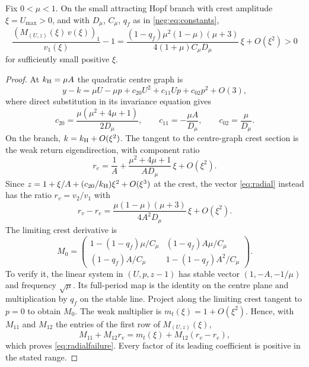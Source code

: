 \begin{theorem}\label{thm:failed}
Fix $0<\mu<1$. On the small attracting Hopf branch with crest amplitude $\xi=U_{\max}>0$, and with $D_\mu$, $C_\mu$, $q_f$ as in \eqref{neg:eq:constants},
\begin{equation}\label{eq:radialfailure}
\frac{(M_{(U,z)}(\xi)\,v(\xi))_1}{v_1(\xi)}-1
=\frac{(1-q_f)\mu^2(1-\mu)(\mu+3)}
 {4(1+\mu)C_\mu D_\mu}\,\xi+O(\xi^2)>0
\end{equation}
for sufficiently small positive $\xi$.
\end{theorem}
\begin{proof}
At $k_{\mathrm H}=\mu A$ the quadratic centre graph is
\begin{equation}\label{neg:eq:centregraph}
y-k=\mu U-\mu p+c_{20}U^2+c_{11}Up+c_{02}p^2+O(3),
\end{equation}
where direct substitution in its invariance equation gives
\begin{equation}\label{neg:eq:centrecoeff}
c_{20}=\frac{\mu(\mu^2+4\mu+1)}{2D_\mu},\qquad
c_{11}=-\frac{\mu A}{D_\mu},\qquad c_{02}=\frac\mu{D_\mu}.
\end{equation}
On the branch, $k=k_{\mathrm H}+O(\xi^2)$. The tangent to the centre-graph crest section is the weak return eigendirection, with component ratio
\[
r_e=\frac1A+\frac{\mu^2+4\mu+1}{AD_\mu}\,\xi+O(\xi^2).
\]
Since $z=1+\xi/A+(c_{20}/k_{\mathrm H})\xi^2+O(\xi^3)$ at the crest, the vector \eqref{eq:radial} instead has the ratio $r_v=v_2/v_1$ with
\begin{equation}\label{neg:eq:mismatch}
r_v-r_e=\frac{\mu(1-\mu)(\mu+3)}{4A^2D_\mu}\,\xi+O(\xi^2).
\end{equation}
The limiting crest derivative is
\begin{equation}\label{neg:eq:Mzero}
M_0=\begin{pmatrix}
1-(1-q_f)\mu/C_\mu &(1-q_f)A\mu/C_\mu\\
(1-q_f)A/C_\mu &1-(1-q_f)A^2/C_\mu
\end{pmatrix}.
\end{equation}
To verify it, the linear system in $(U,p,z-1)$ has stable vector $(1,-A,-1/\mu)$ and frequency $\sqrt\mu$. Its full-period map is the identity on the centre plane and multiplication by $q_f$ on the stable line. Project along the limiting crest tangent to $p=0$ to obtain $M_0$.
The weak multiplier is $m_t(\xi)=1+O(\xi^2)$. Hence, with $M_{11}$ and $M_{12}$ the entries of the first row of $M_{(U,z)}(\xi)$,
\[
M_{11}+M_{12}r_v=m_t(\xi)+M_{12}(r_v-r_e),
\]
which proves \eqref{eq:radialfailure}. Every factor of its leading coefficient is positive in the stated range.
\end{proof}
